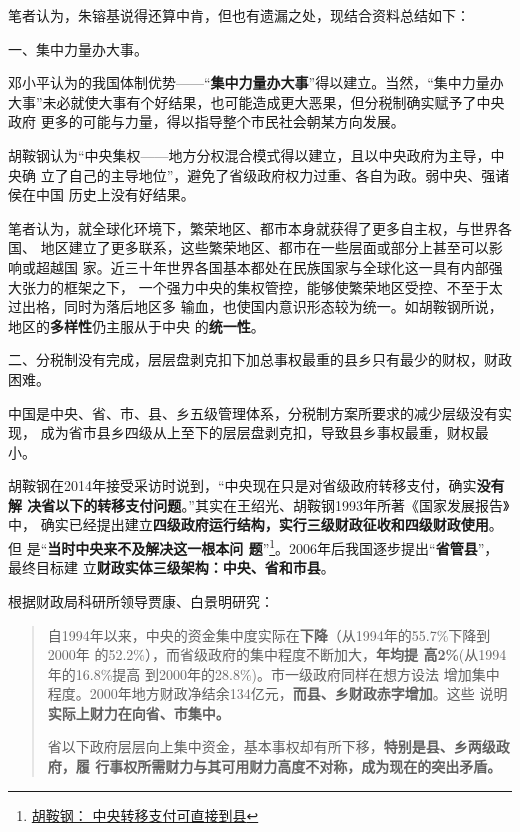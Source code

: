 笔者认为，朱镕基说得还算中肯，但也有遗漏之处，现结合资料总结如下：

{\heiti 一、集中力量办大事。}

邓小平认为的我国体制优势——“\textbf{集中力量办大事}”得以建立。当然，“集中力量办
大事”未必就使大事有个好结果，也可能造成更大恶果，但分税制确实赋予了中央政府
更多的可能与力量，得以指导整个市民社会朝某方向发展。

胡鞍钢认为“中央集权——地方分权混合模式得以建立，且以中央政府为主导，中央确
立了自己的主导地位”，避免了省级政府权力过重、各自为政。弱中央、强诸侯在中国
历史上没有好结果。

笔者认为，就全球化环境下，繁荣地区、都市本身就获得了更多自主权，与世界各国、
地区建立了更多联系，这些繁荣地区、都市在一些层面或部分上甚至可以影响或超越国
家。近三十年世界各国基本都处在民族国家与全球化这一具有内部强大张力的框架之下，
一个强力中央的集权管控，能够使繁荣地区受控、不至于太过出格，同时为落后地区多
输血，也使国内意识形态较为统一。如胡鞍钢所说，地区的\textbf{多样性}仍主服从于中央
的\textbf{统一性}。


{\heiti 二、分税制没有完成，层层盘剥克扣下加总事权最重的县乡只有最少的财权，财政困难。}

中国是中央、省、市、县、乡五级管理体系，分税制方案所要求的减少层级没有实现，
成为省市县乡四级从上至下的层层盘剥克扣，导致县乡事权最重，财权最小。

胡鞍钢在2014年接受采访时说到，“中央现在只是对省级政府转移支付，确实\textbf{没有解
  决省以下的转移支付问题}。”其实在王绍光、胡鞍钢1993年所著《国家发展报告》中，
确实已经提出建立\textbf{四级政府运行结构，实行三级财政征收和四级财政使用}。但
是“\textbf{当时中央来不及解决这一根本问
  题}”\footnote{\href{http://business.sohu.com/20140428/n398892838.shtml}{胡鞍钢：
    中央转移支付可直接到县}}。2006年后我国逐步提出“\textbf{省管县}”，最终目标建
立\textbf{财政实体三级架构：中央、省和市县}。


根据财政局科研所领导贾康、白景明研究：
\begin{quotation}
  自1994年以来，中央的资金集中度实际在\textbf{下降}（从1994年的55.7\%下降到2000年
  的52.2\%），而省级政府的集中程度不断加大，\textbf{年均提
    高2\%}(从1994年的16.8\%提高 到2000年的28.8\%)。市一级政府同样在想方设法
  增加集中程度。2000年地方财政净结余134亿元，\textbf{而县、乡财政赤字增加}。这些
  说明\textbf{实际上财力在向省、市集中。}\cite{xianxiangfenshui}

  省以下政府层层向上集中资金，基本事权却有所下移，\textbf{特别是县、乡两级政府，履
    行事权所需财力与其可用财力高度不对称，成为现在的突出矛盾。}
\end{quotation}


